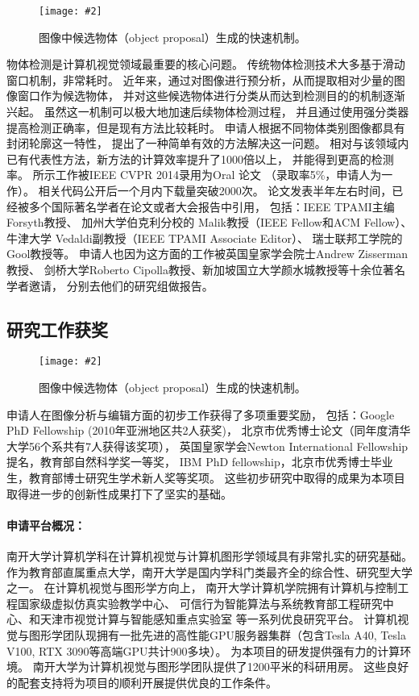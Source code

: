 \documentclass[12pt]{article}
\newcommand{\addImg}[2][1.0]{\texttt{[image: \#2]}}
\newcommand{\myPara}[1]{\paragraph{#1：}}
\begin{document}
\begin{figure}[ht]
    \centering
    \addImg[.8]{figures/Objectness.jpg}
    \caption{图像中候选物体（object proposal）生成的快速机制。}
    \label{fig:objectness}
\end{figure}

物体检测是计算机视觉领域最重要的核心问题。
传统物体检测技术大多基于滑动窗口机制，非常耗时。
近年来，通过对图像进行预分析，从而提取相对少量的图像窗口作为候选物体，
并对这些候选物体进行分类从而达到检测目的的机制逐渐兴起。
虽然这一机制可以极大地加速后续物体检测过程，
并且通过使用强分类器提高检测正确率，但是现有方法比较耗时。
申请人根据不同物体类别图像都具有封闭轮廓这一特性，
提出了一种简单有效的方法解决这一问题。
相对与该领域内已有代表性方法，新方法的计算效率提升了1000倍以上，
并能得到更高的检测率。
所示工作被IEEE CVPR 2014录用为Oral 论文
（录取率5\%，申请人为一作）。
相关代码公开后一个月内下载量突破2000次。
论文发表半年左右时间，已经被多个国际著名学者在论文或者大会报告中引用，
包括：IEEE TPAMI主编 Forsyth教授、
加州大学伯克利分校的 Malik教授（IEEE Fellow和ACM Fellow）、
牛津大学 Vedaldi副教授（IEEE TPAMI Associate Editor）、
瑞士联邦工学院的Gool教授等。
申请人也因为这方面的工作被英国皇家学会院士Andrew Zisserman教授、
剑桥大学Roberto Cipolla教授、新加坡国立大学颜水城教授等十余位著名学者邀请，
分别去他们的研究组做报告。


\subsection{研究工作获奖}


\begin{figure}[ht]
    \centering
    \addImg[.8]{figures/awards.jpg}
    \caption{图像中候选物体（object proposal）生成的快速机制。}
    \label{fig:award}
\end{figure}

申请人在图像分析与编辑方面的初步工作获得了多项重要奖励，
包括：Google PhD Fellowship (2010年亚洲地区共2人获奖)，
北京市优秀博士论文（同年度清华大学56个系共有7人获得该奖项），
英国皇家学会Newton International Fellowship提名，教育部自然科学奖一等奖，
IBM PhD fellowship，北京市优秀博士毕业生，教育部博士研究生学术新人奖等奖项。
这些初步研究中取得的成果为本项目取得进一步的创新性成果打下了坚实的基础。




\myPara{申请平台概况}
南开大学计算机学科在计算机视觉与计算机图形学领域具有非常扎实的研究基础。
作为教育部直属重点大学，南开大学是国内学科门类最齐全的综合性、研究型大学之一。
在计算机视觉与图形学方向上，
南开大学计算机学院拥有计算机与控制工程国家级虚拟仿真实验教学中心、
可信行为智能算法与系统教育部工程研究中心、和天津市视觉计算与智能感知重点实验室
等一系列优良研究平台。
计算机视觉与图形学团队现拥有一批先进的高性能GPU服务器集群（包含Tesla A40, Tesla V100, RTX 3090等高端GPU共计900多块）。
% 
为本项目的研发提供强有力的计算环境。
南开大学为计算机视觉与图形学团队提供了1200平米的科研用房。
这些良好的配套支持将为项目的顺利开展提供优良的工作条件。
\end{document}
